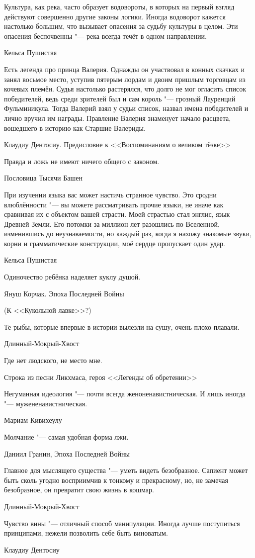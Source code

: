 \epigraph
{Культура, как река, часто образует водовороты, в которых на первый взгляд действуют совершенно другие законы логики.
Иногда водоворот кажется настолько большим, что вызывает опасения за судьбу культуры в целом.
Эти опасения беспочвенны "--- река всегда течёт в одном направлении.}
{Кельса Пушистая}

\epigraph
{Есть легенда про принца Валерия.
Однажды он участвовал в конных скачках и занял восьмое место, уступив пятерым лордам и двоим пришлым торговцам из кочевых племён.
Судья настолько растерялся, что долго не мог огласить список победителей, ведь среди зрителей был и сам король "--- грозный Лауренций Фульминикула.
Тогда Валерий взял у судьи список, назвал имена победителей и лично вручил им награды.
Правление Валерия знаменует начало расцвета, вошедшего в историю как Старшие Валериды.}
{Клаудиу Дентосиу.
Предисловие к <<Воспоминаниям о великом тёзке>>}

\epigraph
{Правда и ложь не имеют ничего общего с законом.}
{Пословица Тысячи Башен}

\epigraph
{При изучении языка вас может настичь странное чувство.
Это сродни влюблённости "--- вы можете рассматривать прочие языки, не иначе как сравнивая их с объектом вашей страсти.
Моей страстью стал энглис, язык Древней Земли.
Его потомки за миллион лет разошлись по Вселенной, изменившись до неузнаваемости, но каждый раз, когда я нахожу знакомые звуки, корни и грамматические конструкции, моё сердце пропускает один удар.}
{Кельса Пушистая}

\epigraph
{Одиночество ребёнка наделяет куклу душой.}
{Януш Корчак.
Эпоха Последней Войны}
(К <<Кукольной лавке>>?)

\epigraph{Те рыбы, которые впервые в истории вылезли на сушу, очень плохо плавали.}
{Длинный-Мокрый-Хвост}

\epigraph
{Где нет людского, не место мне.}
{Строка из песни Ликхмаса, героя <<Легенды об обретении>>}

\epigraph
{Негуманная идеология "--- почти всегда женоненавистническая.
И лишь иногда "--- мужененавистническая.}
{Мариам Кивихеулу}

\epigraph
{Молчание "--- самая удобная форма лжи.}
{Даниил Гранин, Эпоха Последней Войны}

\epigraph
{Главное для мыслящего существа "--- уметь видеть безобразное.
Сапиент может быть сколь угодно восприимчив к тонкому и прекрасному, но, не замечая безобразное, он превратит свою жизнь в кошмар.}
{Длинный-Мокрый-Хвост}

\epigraph
{Чувство вины "--- отличный способ манипуляции.
Иногда лучше поступиться принципами, нежели позволить себе быть виноватым.}
{Клаудиу Дентосиу}

